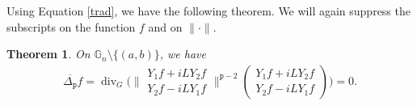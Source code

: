 \documentclass[12pt]{amsart}
\theoremstyle{plain}
\newtheorem{theorem}{Theorem}[section]
\theoremstyle{definition}
\numberwithin{equation}{section}
\begin{document}
Using Equation \eqref{trad}, we have the following theorem. We will again suppress the subscripts on the function $f$ and on $\|\cdot\|$. 
\begin{theorem}
On $\mathbb{G}_n\setminus\{(a,b)\}$, we have
\begin{eqnarray*}
\overline{\Delta_{\texttt{p}}}f={\operatorname{div}}_G{\Bigg( \bigg\| \begin{array}{c}
 Y_1f+iLY_2f\\
 Y_2f-iLY_1f
\end{array} \bigg\|^{{\texttt{p}}-2} 
 \left( \begin{array}{c}
Y_1f+iLY_2f\\
Y_2f-iLY_1f
\end{array} \right) \Bigg)}=0.
\end{eqnarray*}
\end{theorem}
\end{document}
